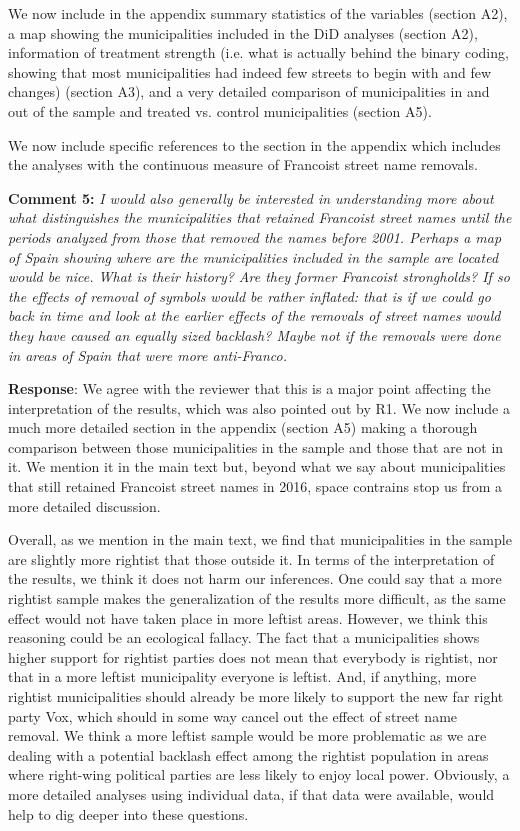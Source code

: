 \documentclass[12pt, a4paper, notitlepage]{article}
\begin{document}
We now include in the appendix summary statistics of the variables (section A2), a map showing the municipalities included in the DiD analyses (section A2), information of treatment strength (i.e. what is actually behind the binary coding, showing that most municipalities had indeed few streets to begin with and few changes) (section A3), and a very detailed comparison of municipalities in and out of the sample and treated vs. control municipalities (section A5).

We now include specific references to the section in the appendix which includes the analyses with the continuous measure of Francoist street name removals.

\textbf{Comment 5:} \textit{I would also generally be interested in understanding more about what distinguishes the municipalities that retained Francoist street names until the periods analyzed from those that removed the names before 2001. Perhaps a map of Spain showing where are the municipalities included in the sample are located would be nice. What is their history? Are they former Francoist strongholds? If so the effects of removal of symbols would be rather inflated: that is if we could go back in time and look at the earlier effects of the removals of street names would they have caused an equally sized backlash? Maybe not if the removals were done in areas of Spain that were more anti-Franco.}

\textbf{Response}: We agree with the reviewer that this is a major point affecting the interpretation of the results, which was also pointed out by R1. We now include a much more detailed section in the appendix (section A5) making a thorough comparison between those municipalities in the sample and those that are not in it. We mention it in the main text but, beyond what we say about municipalities that still retained Francoist street names in 2016, space contrains stop us from a more detailed discussion.

Overall, as we mention in the main text, we find that municipalities in the sample are slightly more rightist that those outside it. In terms of the interpretation of the results, we think it does not harm our inferences. One could say that a more rightist sample makes the generalization of the results more difficult, as the same effect would not have taken place in more leftist areas. However, we think this reasoning could be an ecological fallacy. The fact that a municipalities shows higher support for rightist parties does not mean that everybody is rightist, nor that in a more leftist municipality everyone is leftist.
And, if anything, more rightist municipalities should already be more likely to support the new far right party Vox, which should in some way cancel out the effect of street name removal.
We think a more leftist sample would be more problematic as we are dealing with a potential backlash effect among the rightist population in areas where right-wing political parties are less likely to enjoy local power.
Obviously, a more detailed analyses using individual data, if that data were available, would help to dig deeper into these questions.
\end{document}
